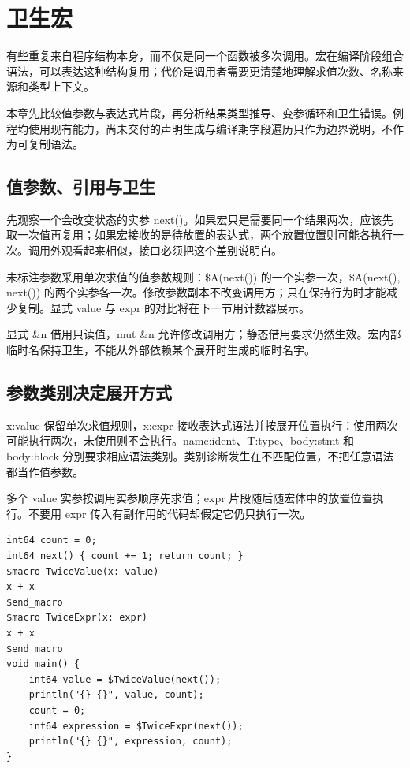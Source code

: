 \chapter{卫生宏}
\label{ch:19}

有些重复来自程序结构本身，而不仅是同一个函数被多次调用。宏在编译阶段组合语法，可以表达这种结构复用；代价是调用者需要更清楚地理解求值次数、名称来源和类型上下文。

本章先比较值参数与表达式片段，再分析结果类型推导、变参循环和卫生错误。例程均使用现有能力，尚未交付的声明生成与编译期字段遍历只作为边界说明，不作为可复制语法。

\section{值参数、引用与卫生}

先观察一个会改变状态的实参 next()。如果宏只是需要同一个结果两次，应该先取一次值再复用；如果宏接收的是待放置的表达式，两个放置位置则可能各执行一次。调用外观看起来相似，接口必须把这个差别说明白。

未标注参数采用单次求值的值参数规则：\$A(next()) 的一个实参一次，\$A(next(), next()) 的两个实参各一次。修改参数副本不改变调用方；只在保持行为时才能减少复制。显式 value 与 expr 的对比将在下一节用计数器展示。

显式 \&n 借用只读值，mut \&n 允许修改调用方；静态借用要求仍然生效。宏内部临时名保持卫生，不能从外部依赖某个展开时生成的临时名字。

\section{参数类别决定展开方式}

x:value 保留单次求值规则，x:expr 接收表达式语法并按展开位置执行：使用两次可能执行两次，未使用则不会执行。name:ident、T:type、body:stmt 和 body:block 分别要求相应语法类别。类别诊断发生在不匹配位置，不把任意语法都当作值参数。

多个 value 实参按调用实参顺序先求值；expr 片段随后随宏体中的放置位置执行。不要用 expr 传入有副作用的代码却假定它仍只执行一次。

\par
\medskip
\begin{lstlisting}[style=chali]
int64 count = 0;
int64 next() { count += 1; return count; }
$macro TwiceValue(x: value)
x + x
$end_macro
$macro TwiceExpr(x: expr)
x + x
$end_macro
void main() {
    int64 value = $TwiceValue(next());
    println("{} {}", value, count);
    count = 0;
    int64 expression = $TwiceExpr(next());
    println("{} {}", expression, count);
}
\end{lstlisting}
\par
\medskip

